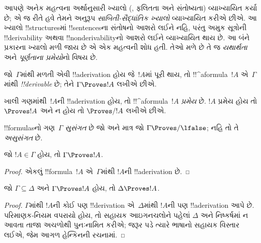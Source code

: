 \documentclass[../../../include/open-logic-section]{subfiles}
\begin{document}
      {}
      {}


\begin{explain}
આપણે અનેક મહત્વના અર્થાનુસારી ખ્યાલો
(, ફલિતતા અને સંતોષ્યતા) વ્યાખ્યાયિત
કર્યા છે; એ જ રીતે હવે તેમને અનુરૂપ \emph{સાબિતી-સૈદ્ધાંતિક ખ્યાલો}
વ્યાખ્યાયિત કરીએ છીએ. આ ખ્યાલો !!{structure}sમાં !!{sentence}sના
સંતોષનો આશરો લઈને નહિ, પરંતુ અમુક સૂત્રોની !!{derivability} અથવા
!!{nonderivability}નો આશરો લઈને વ્યાખ્યાયિત થાય છે. આ બંને પ્રકારના
ખ્યાલો મળી જાય છે એ એક મહત્વની શોધ હતી. તેઓ મળે છે તે જ
\emph{યથાર્થતા} અને \emph{પૂર્ણતાના પ્રમેયો}નો વિષય છે.
\end{explain}

\begin{defn}[!!^{derivability}]
જો~$\Gamma$માંથી મળતી એવી !!a{derivation} હોય જે~$!A$માં પૂરી થાય,
તો !!^a{formula}~$!A$ એ~$\Gamma$માંથી \emph{!!{derivable}} છે; તેને
$\Gamma \Proves !A$ લખીએ છીએ.
\end{defn}

\begin{defn}[પ્રમેયો]
ખાલી ગણમાંથી~$!A$ની !!a{derivation} હોય, તો !!^a{formula}~$!A$
\emph{પ્રમેય} છે. $!A$ પ્રમેય હોય તો $\Proves !A$ અને ન હોય તો
$\Proves/ !A$ લખીએ છીએ.
\end{defn}

\begin{defn}[સુસંગતતા]
!!{formula}sનો ગણ~$\Gamma$ \emph{સુસંગત} છે જો અને માત્ર જો
$\Gamma\Proves/ \lfalse$; નહિ તો તે \emph{અસુસંગત} છે.
\end{defn}

\begin{prop}[સ્વવાચકતા]
જો $!A \in \Gamma$ હોય, તો $\Gamma \Proves !A$.
\end{prop}

\begin{proof}
  એકલું !!{formula}~$!A$ એ~$\Gamma$માંથી $!A$ની !!a{derivation} છે.
\end{proof}

\begin{prop}
જો $\Gamma \subseteq \Delta$ અને $\Gamma \Proves !A$ હોય, તો
$\Delta \Proves !A$.
\end{prop}

\begin{proof}
$\Gamma$માંથી $!A$ની કોઈ પણ !!{derivation} એ~$\Delta$માંથી $!A$ની પણ
!!a{derivation} આપે છે. પરિમાણક-નિયમ વપરાયો હોય, તો સહાયક આઇગનચલોને
પહેલાં $\Delta$ અને નિષ્કર્ષમાં ન આવતા તાજા અચળોથી પુનઃનામિત કરીએ;
જરૂર પડે ત્યારે ભાષાનો સહાયક વિસ્તાર લઈએ, જેમ આગળ હેન્કિનની રચનામાં.
\end{proof}
\end{document}
